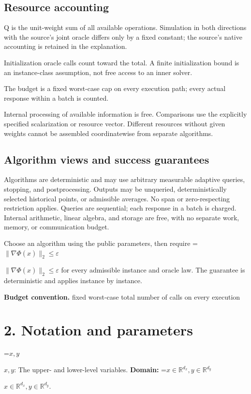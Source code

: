 \documentclass[10pt,a4paper]{article}
\newcommand{\AtlasMath}[1]{\par\begingroup\centering\setbox0=\hbox{$\displaystyle #1$}\ifdim\wd0>1.4\linewidth\typeout{ATLAS WIDE FORMULA: \the\wd0}\fi\ifdim\wd0>\linewidth\resizebox{\linewidth}{!}{\box0}\else\box0\fi\par\endgroup}
\newcommand{\AtlasInlineMath}[1]{\begingroup\setbox0=\hbox{$#1$}\ifdim\wd0>.4\linewidth\endgroup\AtlasMath{#1}\else\endgroup$#1$\fi}
\begin{document}
\subsection{Resource accounting}
Q is the unit-weight sum of all available operations. Simulation in both directions with the source's joint oracle differs only by a fixed constant; the source's native accounting is retained in the explanation.

Initialization oracle calls count toward the total. A finite initialization bound is an instance-class assumption, not free access to an inner solver.

The budget is a fixed worst-case cap on every execution path; every actual response within a batch is counted.

Internal processing of available information is free. Comparisons use the explicitly specified scalarization or resource vector. Different resources without given weights cannot be assembled coordinatewise from separate algorithms.

\subsection{Algorithm views and success guarantees}
Algorithms are deterministic and may use arbitrary measurable adaptive queries, stopping, and postprocessing. Outputs may be unqueried, deterministically selected historical points, or admissible averages. No span or zero-respecting restriction applies. Queries are sequential; each response in a batch is charged. Internal arithmetic, linear algebra, and storage are free, with no separate work, memory, or communication budget.

Choose an algorithm using the public parameters, then require \AtlasInlineMath{\|\nabla\Phi(\widehat{x})\|_2\le\varepsilon} for every admissible instance and oracle law. The guarantee is deterministic and applies instance by instance.

\textbf{Budget convention.} fixed worst-case total number of calls on every execution

\section{2. Notation and parameters}
\AtlasInlineMath{x,y}: The upper- and lower-level variables. \textbf{Domain:} \AtlasInlineMath{x\in\mathbb R^{d_x},y\in\mathbb R^{d_y}}.
\end{document}

